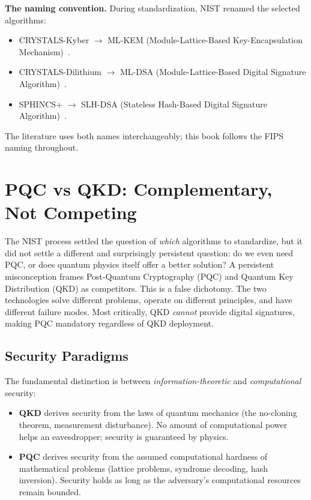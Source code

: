 \begin{svgraybox}
\textbf{The naming convention.}
During standardization, NIST renamed the selected algorithms:
\begin{itemize}
\item CRYSTALS-Kyber $\to$ ML-KEM (Module-Lattice-Based Key-Encapsulation Mechanism)~\cite{FIPS203}.
\item CRYSTALS-Dilithium $\to$ ML-DSA (Module-Lattice-Based Digital Signature Algorithm)~\cite{FIPS204}.
\item SPHINCS+ $\to$ SLH-DSA (Stateless Hash-Based Digital Signature Algorithm)~\cite{FIPS205}.
\end{itemize}
The literature uses both names interchangeably; this book follows the FIPS naming throughout.
\end{svgraybox}


\section{PQC vs QKD: Complementary, Not Competing}
\label{sec:pqc-vs-qkd}

The NIST process settled the question of \emph{which} algorithms to standardize, but it did not settle a different and surprisingly persistent question: do we even need PQC, or does quantum physics itself offer a better solution?  A persistent misconception frames Post-Quantum Cryptography (PQC) and Quantum Key Distribution (QKD) as competitors.  This is a false dichotomy.  The two technologies solve different problems, operate on different principles, and have different failure modes.  Most critically, QKD \emph{cannot} provide digital signatures, making PQC mandatory regardless of QKD deployment.

\subsection{Security Paradigms}
\label{subsec:security-paradigms}

The fundamental distinction is between \emph{information-theoretic} and \emph{computational} security:

\begin{itemize}
\item \textbf{QKD} derives security from the laws of quantum mechanics (the no-cloning theorem, measurement disturbance).  No amount of computational power helps an eavesdropper; security is guaranteed by physics.

\item \textbf{PQC} derives security from the assumed computational hardness of mathematical problems (lattice problems, syndrome decoding, hash inversion).  Security holds as long as the adversary's computational resources remain bounded.
\end{itemize}

